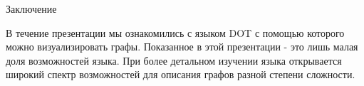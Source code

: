 \documentclass{beamer}
\begin{document}
\begin{frame}[fragile]{Заключение}
	\begin{minipage}{0.5\textwidth}
		В течение презентации мы ознакомились с языком DOT с помощью которого можно визуализировать графы. Показанное в этой презентации - это лишь малая доля возможностей языка. При более детальном изучении языка открывается широкий спектр возможностей для описания графов разной степени сложности.
	\end{minipage}
	\hfill
	\begin{minipage}{0.4\textwidth}
	\end{minipage}
\end{frame}          
\end{document}
